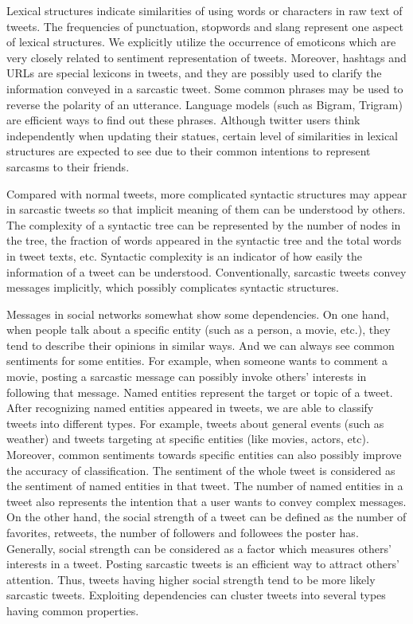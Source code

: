 Lexical structures indicate similarities of using words or characters in raw text of tweets. The frequencies of punctuation, stopwords and slang represent one aspect of lexical structures. We explicitly utilize the occurrence of emoticons which are very closely related to sentiment representation of tweets. Moreover, hashtags and URLs are special lexicons in tweets, and they are possibly used to clarify the information conveyed in a sarcastic tweet. Some common phrases may be used to reverse the polarity of an utterance. Language models (such as Bigram, Trigram) are efficient ways to find out these phrases. Although twitter users think independently when updating their statues, certain level of similarities in lexical structures are expected to see due to their common intentions to represent sarcasms to their friends.

Compared with normal tweets, more complicated syntactic structures may appear in sarcastic tweets so that implicit meaning of them can be understood by others. The complexity of a syntactic tree can be represented by the number of nodes in the tree, the fraction of words appeared in the syntactic tree and the total words in tweet texts, etc. Syntactic complexity is an indicator of how easily the information of a tweet can be understood. Conventionally, sarcastic tweets convey messages implicitly, which possibly complicates syntactic structures.

Messages in social networks somewhat show some dependencies. On one hand, when people talk about a specific entity (such as a person, a movie, etc.), they tend to describe their opinions in similar ways. And we can always see common sentiments for some entities. For example, when someone wants to comment a movie, posting a sarcastic message can possibly invoke others' interests in following that message. Named entities represent the target or topic of a tweet. After recognizing named entities appeared in tweets, we are able to classify tweets into different types. For example, tweets about general events (such as weather) and tweets targeting at specific entities (like movies, actors, etc). Moreover, common sentiments towards specific entities can also possibly improve the accuracy of classification. The sentiment of the whole tweet is considered as the sentiment of named entities in that tweet. The number of named entities in a tweet also represents the intention that a user wants to convey complex messages. On the other hand, the social strength of a tweet can be defined as the number of favorites, retweets, the number of followers and followees the poster has. Generally, social strength can be considered as a factor which measures others' interests in a tweet. Posting sarcastic tweets is an efficient way to attract others' attention. Thus, tweets having higher social strength tend to be more likely sarcastic tweets. Exploiting dependencies can cluster tweets into several types having common properties. 


